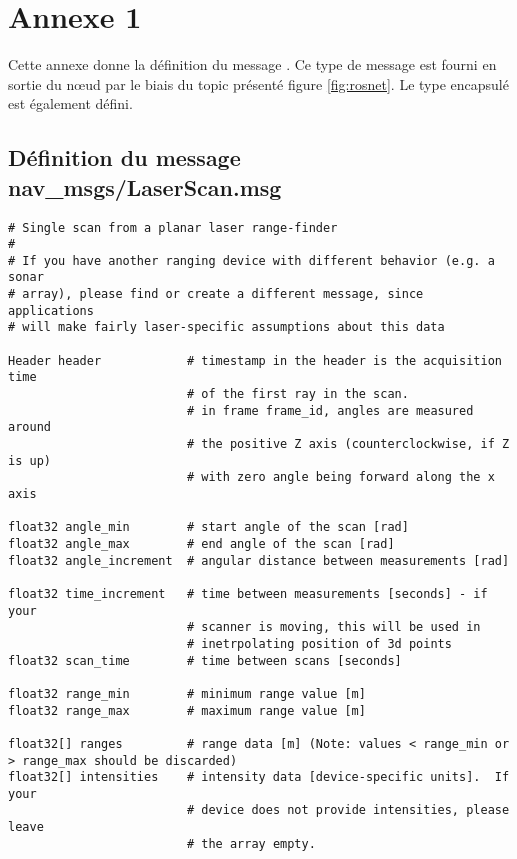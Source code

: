 \chapter*{Annexe 1}
\label{annexe:laserscan}

\makeatletter
\renewcommand{\thesection}{\@arabic\c@section}
\makeatother

\setcounter{section}{0}

Cette annexe donne la définition du message . 
Ce type de message est fourni en sortie du n\oe{}ud  par le biais du topic  présenté figure \ref{fig:rosnet}.
Le type  encapsulé est également défini. 

\section{Définition du message nav\_msgs/LaserScan.msg}

\begin{lstlisting}[style = custombash]
# Single scan from a planar laser range-finder
#
# If you have another ranging device with different behavior (e.g. a sonar
# array), please find or create a different message, since applications
# will make fairly laser-specific assumptions about this data

Header header            # timestamp in the header is the acquisition time 
                         # of the first ray in the scan.
                         # in frame frame_id, angles are measured around 
                         # the positive Z axis (counterclockwise, if Z is up)
                         # with zero angle being forward along the x axis
                         
float32 angle_min        # start angle of the scan [rad]
float32 angle_max        # end angle of the scan [rad]
float32 angle_increment  # angular distance between measurements [rad]

float32 time_increment   # time between measurements [seconds] - if your
                         # scanner is moving, this will be used in 
                         # inetrpolating position of 3d points
float32 scan_time        # time between scans [seconds]

float32 range_min        # minimum range value [m]
float32 range_max        # maximum range value [m]

float32[] ranges         # range data [m] (Note: values < range_min or > range_max should be discarded)
float32[] intensities    # intensity data [device-specific units].  If your
                         # device does not provide intensities, please leave
                         # the array empty.
\end{lstlisting}

